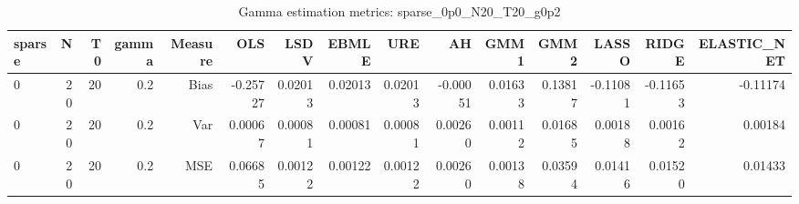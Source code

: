 \begin{table}[!htbp]\centering
\caption{Gamma estimation metrics: sparse_0p0_N20_T20_g0p2}
\label{tab:table1_sparse_0p0_N20_T20_g0p2}
\begin{tabular}{lrrrrrrrrrrrrrr}
\hline
sparse & N & T0 & gamma & Measure & OLS & LSDV & EBMLE & URE & AH & GMM1 & GMM2 & LASSO & RIDGE & ELASTIC_NET \\
\hline
0 & 20 & 20 & 0.2 & Bias & -0.25727 & 0.02013 & 0.02013 & 0.02013 & -0.00051 & 0.01633 & 0.13817 & -0.11081 & -0.11653 & -0.11174 \\
0 & 20 & 20 & 0.2 & Var & 0.00067 & 0.00081 & 0.00081 & 0.00081 & 0.00260 & 0.00112 & 0.01685 & 0.00188 & 0.00162 & 0.00184 \\
0 & 20 & 20 & 0.2 & MSE & 0.06685 & 0.00122 & 0.00122 & 0.00122 & 0.00260 & 0.00138 & 0.03594 & 0.01416 & 0.01520 & 0.01433 \\
\hline
\end{tabular}
\end{table}

